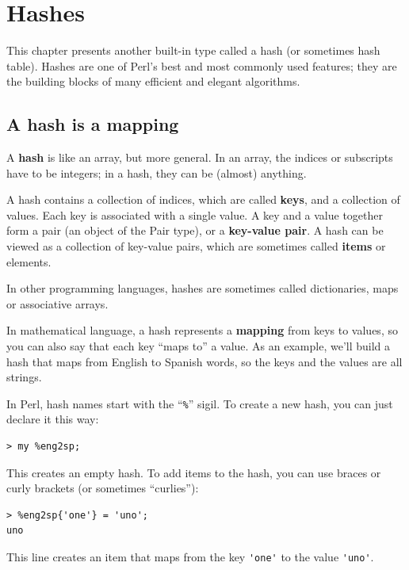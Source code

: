 
\chapter{Hashes}
\label{hashes}

This chapter presents another built-in type called a hash 
(or sometimes hash table). Hashes are one of Perl's best 
and most commonly used features; they are the building 
blocks of many efficient and elegant algorithms.


\section{A hash is a mapping}
\label{hash_descr}

A {\bf hash} is like an array, but more general.  In an 
array, the indices or subscripts have to be integers; in a hash, 
they can be (almost) anything.

A hash contains a collection of indices, which are called 
{\bf keys}, and a collection of values.  Each key is associated with a single value.  A key and a value together form a pair 
(an object of the Pair type), or a {\bf key-value pair}. A 
hash can be viewed as a collection of key-value pairs, which 
are sometimes called {\bf items} or elements.  

In other programming languages, hashes are sometimes called 
dictionaries, maps or associative arrays.

In mathematical language, a hash represents a {\bf mapping}
from keys to values, so you can also say that each key
``maps to'' a value. As an example, we'll build a hash that 
maps from English to Spanish words, so the keys and the 
values are all strings.

In Perl, hash names start with the ``\verb"%"'' sigil. To create 
a new hash, you can just declare it this way:

\begin{verbatim}
> my %eng2sp;
\end{verbatim}

This creates an empty hash. To add items to the hash, 
you can use braces or curly brackets (or sometimes ``curlies''):

\begin{verbatim}
> %eng2sp{'one'} = 'uno';
uno
\end{verbatim}
%
This line creates an item that maps from the key
\verb"'one'" to the value \verb"'uno'".  

